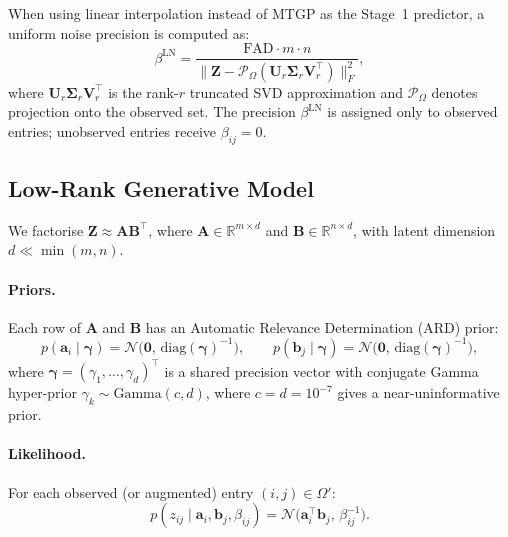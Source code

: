 \documentclass[11pt,a4paper]{article}
\newcommand{\R}{\mathbb{R}}
\newcommand{\N}{\mathcal{N}}
\newcommand{\diag}{\mathrm{diag}}
\begin{document}
When using linear interpolation instead of MTGP as the Stage~1 predictor, a uniform noise precision is computed as:
\begin{equation}\label{eq:beta_linear}
  \beta^{\text{LN}} = \frac{\text{FAD} \cdot m \cdot n}{\| \bm{Z} - \mathcal{P}_\Omega(\bm{U}_r \bm{\Sigma}_r \bm{V}_r^\top) \|_F^2},
\end{equation}
where $\bm{U}_r \bm{\Sigma}_r \bm{V}_r^\top$ is the rank-$r$ truncated SVD approximation and $\mathcal{P}_\Omega$ denotes projection onto the observed set. The precision $\beta^{\text{LN}}$ is assigned only to observed entries; unobserved entries receive $\beta_{ij} = 0$.

\subsection{Low-Rank Generative Model}
We factorise $\bm{Z} \approx \bm{A}\bm{B}^\top$, where $\bm{A} \in \R^{m \times d}$ and $\bm{B} \in \R^{n \times d}$, with latent dimension $d \ll \min(m,n)$.

\paragraph{Priors.} Each row of $\bm{A}$ and $\bm{B}$ has an Automatic Relevance Determination (ARD) prior:
\begin{equation}\label{eq:prior_ab}
  p(\bm{a}_i \mid \bm{\gamma}) = \N\!\bigl(\bm{0},\, \diag(\bm{\gamma})^{-1}\bigr),
  \qquad
  p(\bm{b}_j \mid \bm{\gamma}) = \N\!\bigl(\bm{0},\, \diag(\bm{\gamma})^{-1}\bigr),
\end{equation}
where $\bm{\gamma} = (\gamma_1,\dots,\gamma_d)^\top$ is a shared precision vector with conjugate Gamma hyper-prior $\gamma_k \sim \mathrm{Gamma}(c,d)$, where $c = d = 10^{-7}$ gives a near-uninformative prior.

\paragraph{Likelihood.} For each observed (or augmented) entry $(i,j) \in \Omega'$:
\begin{equation}\label{eq:likelihood_mc}
  p(z_{ij} \mid \bm{a}_i, \bm{b}_j, \beta_{ij})
  = \N\!\bigl(\bm{a}_i^\top \bm{b}_j,\, \beta_{ij}^{-1}\bigr).
\end{equation}
\end{document}
